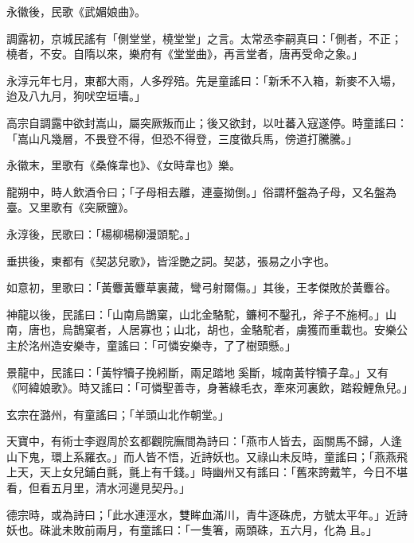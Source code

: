 \begin{pinyinscope}
 永徽後，民歌《武媚娘曲》。



 調露初，京城民謠有「側堂堂，橈堂堂」之言。太常丞李嗣真曰：「側者，不正；橈者，不安。自隋以來，樂府有《堂堂曲》，再言堂者，唐再受命之象。」



 永淳元年七月，東都大雨，人多殍殕。先是童謠曰：「新禾不入箱，新麥不入場，迨及八九月，狗吠空垣墻。」



 高宗自調露中欲封嵩山，屬突厥叛而止；後又欲封，以吐蕃入寇遂停。時童謠曰：「嵩山凡幾層，不畏登不得，但恐不得登，三度徵兵馬，傍道打騰騰。」



 永徽末，里歌有《桑條韋也》、《女時韋也》樂。



 龍朔中，時人飲酒令曰；「子母相去離，連臺拗倒。」俗謂杯盤為子母，又名盤為臺。又里歌有《突厥鹽》。



 永淳後，民歌曰：「楊柳楊柳漫頭駝。」



 垂拱後，東都有《契苾兒歌》，皆淫艷之詞。契苾，張易之小字也。



 如意初，里歌曰：「黃麞黃麞草裏藏，彎弓射爾傷。」其後，王孝傑敗於黃麞谷。



 神龍以後，民謠曰：「山南烏鵲窠，山北金駱駝，鐮柯不鑿孔，斧子不施柯。」山南，唐也，烏鵲窠者，人居寡也；山北，胡也，金駱駝者，虜獲而重載也。安樂公主於洺州造安樂寺，童謠曰：「可憐安樂寺，了了樹頭懸。」



 景龍中，民謠曰：「黃牸犢子挽紖斷，兩足踏地奚斷，城南黃牸犢子韋。」又有《阿緯娘歌》。時又謠曰：「可憐聖善寺，身著綠毛衣，牽來河裏飲，踏殺鯉魚兒。」



 玄宗在潞州，有童謠曰；「羊頭山北作朝堂。」



 天寶中，有術士李遐周於玄都觀院廡間為詩曰：「燕市人皆去，函關馬不歸，人逢山下鬼，環上系羅衣。」而人皆不悟，近詩妖也。又祿山未反時，童謠曰；「燕燕飛上天，天上女兒鋪白氈，氈上有千錢。」時幽州又有謠曰：「舊來誇戴竿，今日不堪看，但看五月里，清水河邊見契丹。」



 德宗時，或為詩曰；「此水連涇水，雙眸血滿川，青牛逐硃虎，方號太平年。」近詩妖也。硃泚未敗前兩月，有童謠曰：「一隻箸，兩頭硃，五六月，化為且。」




\end{pinyinscope}
